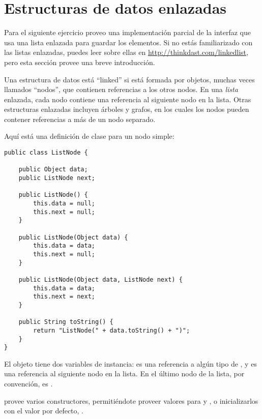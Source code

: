 \documentclass[12pt]{book}
\theoremstyle{exercise}
\begin{document}
\section{Estructuras de datos enlazadas}
\label{linked-data-structures}

Para el siguiente ejercicio proveo una implementación parcial de la
interfaz  que usa una lista enlazada para guardar los elementos.
Si no estás familiarizado con las listas enlazadas, puedes leer sobre ellas en
\url{http://thinkdast.com/linkedlist},
pero esta sección provee una breve introducción.


Una estructura de datos está ``linked'' si está formada por objetos, muchas veces llamados
``nodos'', que contienen referencias a los otros nodos. En una \emph{lista} enlazada,
cada nodo contiene una referencia al siguiente nodo en la lista. Otras estructuras enlazadas
incluyen árboles y grafos, en los cuales los nodos pueden contener referencias a más de
un nodo separado.

Aquí está una definición de clase para un nodo simple:

\begin{verbatim}
public class ListNode {

    public Object data;
    public ListNode next;

    public ListNode() {
        this.data = null;
        this.next = null;
    }

    public ListNode(Object data) {
        this.data = data;
        this.next = null;
    }

    public ListNode(Object data, ListNode next) {
        this.data = data;
        this.next = next;
    }

    public String toString() {
        return "ListNode(" + data.toString() + ")";
    }
}
\end{verbatim}

El objeto  tiene dos variables de instancia:  es una
referencia a algún tipo de , y  es una referencia al
siguiente nodo en la lista. En el último nodo de la lista, por convención,
 es .


 provee varios constructores, permitiéndote proveer valores
para  y , o inicializarlos con el valor por defecto, .

\end{document}
